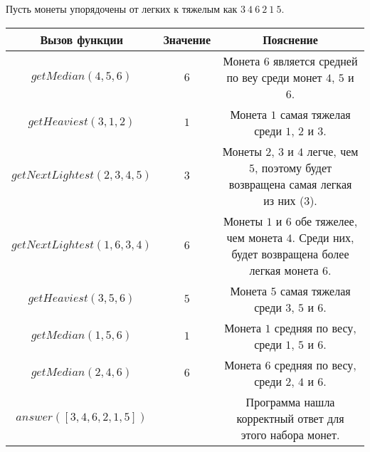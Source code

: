 Пусть монеты упорядочены от легких к тяжелым как $3\ 4\ 6\ 2\ 1\ 5$.
\begin{center}
\renewcommand{\arraystretch}{1.5}
\begin{tabular}{|c|c|c|}
\hline
Вызов функции & Значение & Пояснение \\
\hline
$getMedian(4,5,6)$ & $6$ & Монета $6$ является средней по веу среди монет $4$, $5$ и $6$.\\
\hline
$getHeaviest(3,1,2)$ & $1$ & Монета $1$ самая тяжелая среди $1$, $2$ и $3$.\\
\hline
$getNextLightest(2,3,4,5)$ & $3$ & \parbox{10cm}{\centering \vspace{2mm}Монеты $2$, $3$ и $4$ легче, чем $5$, поэтому будет возвращена самая легкая из них (3). \\\vspace{2mm}}\\
\hline
$getNextLightest(1,6,3,4)$ & $6$ & \parbox{10cm}{\centering \vspace{2mm}Монеты $1$ и $6$ обе тяжелее, чем монета $4$. Среди них, будет возвращена более легкая монета $6$.\\\vspace{2mm}}\\
\hline
$getHeaviest(3,5,6)$ & $5$ & Монета $5$ самая тяжелая среди $3$, $5$ и $6$.\\
\hline
$getMedian(1,5,6)$ & $1$ & Монета $1$ средняя по весу, среди $1$, $5$ и $6$.\\
\hline
$getMedian(2,4,6)$ & $6$ & Монета $6$ средняя по весу, среди $2$, $4$ и $6$.\\
\hline
$answer([3,4,6,2,1,5])$ & & Программа нашла корректный ответ для этого набора монет.\\
\hline
\end{tabular}
\end{center}
